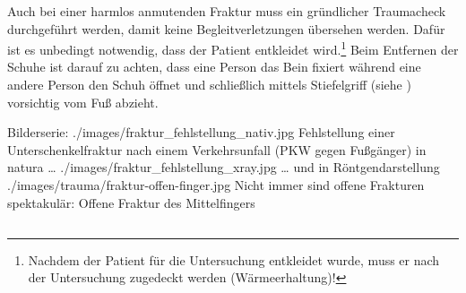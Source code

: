 Auch bei einer harmlos anmutenden Fraktur muss ein
gründlicher Traumacheck durchgeführt werden, damit keine
Begleitverletzungen übersehen werden. Dafür ist es unbedingt
notwendig, dass der Patient entkleidet
wird.\footnote{Nachdem der Patient für die Untersuchung
entkleidet wurde, muss er nach der Untersuchung zugedeckt
werden (Wärmeerhaltung)!} Beim Entfernen der Schuhe ist
darauf zu achten, dass eine Person das Bein fixiert
während eine andere Person den Schuh öffnet und schließlich 
mittels Stiefelgriff (siehe
) vorsichtig
vom Fuß abzieht.




\begin{PictureSeriesWide}{}{Bilderserie: }
{./images/fraktur_fehlstellung_nativ.jpg}
{Fehlstellung einer
Unterschenkelfraktur nach einem Verkehrsunfall (PKW gegen
Fußgänger) in natura {\ldots} }
{./images/fraktur_fehlstellung_xray.jpg}
{{\ldots} und in Röntgendarstellung }
{./images/trauma/fraktur-offen-finger.jpg}
{Nicht immer sind offene Frakturen
spektakulär: Offene Fraktur des Mittelfingers
}
{}
{}
\end{PictureSeriesWide}




\subsection{}


